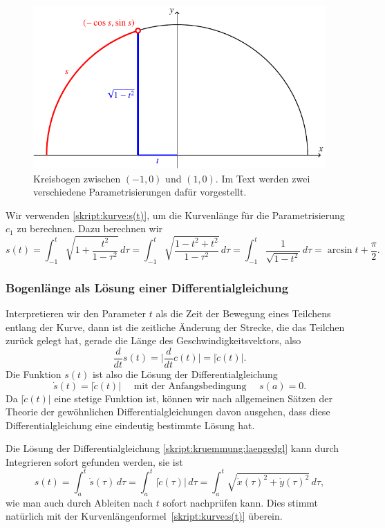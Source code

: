 \begin{figure}
\centering
\includegraphics{chapters/tikz/kreisbogen.pdf}
\caption{Kreisbogen zwischen $(-1,0)$ und $(1,0)$. Im Text werden
zwei verschiedene Parametrisierungen dafür vorgestellt.
\label{skript:1dim:kreisbogen}}
\end{figure}

Wir verwenden \eqref{skript:kurve:s(t)}, um die Kurvenlänge für die
Parametrisierung $c_1$ zu berechnen.
Dazu berechnen wir
\[
s(t)
=
\int_{-1}^t \sqrt{1+\frac{t^2}{1-\tau^2}}\,d\tau
=
\int_{-1}^t \sqrt{\frac{1-t^2  +t^2}{1-\tau^2}}\,d\tau
=
\int_{-1}^t \frac{1}{\sqrt{1-t^2}} \,d\tau
=
\arcsin t + \frac{\pi}2.
\]

\subsubsection{Bogenlänge als Lösung einer Differentialgleichung}
Interpretieren wir den Parameter $t$ als die Zeit der Bewegung eines 
Teilchens entlang der Kurve, dann ist die zeitliche Änderung der Strecke,
die das Teilchen zurück gelegt hat, gerade die Länge des
Geschwindigkeitsvektors, also
\[
\frac{d}{dt} s(t) = \biggl|\frac{d}{dt}c(t)\biggr| = |\dot c(t)|.
\]
Die Funktion $s(t)$ ist also die Lösung der Differentialgleichung
\begin{equation}
\dot s(t)=|\dot c(t)|
\quad
\text{ mit der Anfangsbedingung }\quad s(a)=0.
\label{skript:kruemmung:laengedgl}
\end{equation}
Da $|\dot c(t)|$ eine stetige Funktion ist, können wir nach allgemeinen
Sätzen der Theorie der gewöhnlichen Differentialgleichungen davon ausgehen,
dass diese Differentialgleichung eine eindeutig bestimmte Lösung hat.

Die Lösung der Differentialgleichung \eqref{skript:kruemmung:laengedgl} kann 
durch Integrieren sofort gefunden werden, sie ist
\begin{equation}
s(t)
=
\int_a^t \dot s(\tau)\,d\tau
=
\int_a^t |\dot c(\tau)| \,d\tau
=
\int_a^t \sqrt{\dot x(\tau)^2 + \dot y(\tau)^2}\,d\tau,
\label{skript:kruemmung:laenge}
\end{equation}
wie man auch durch Ableiten nach $t$ sofort nachprüfen kann.
Dies stimmt natürlich mit der Kurvenlängenformel~\eqref{skript:kurve:s(t)}
überein.

